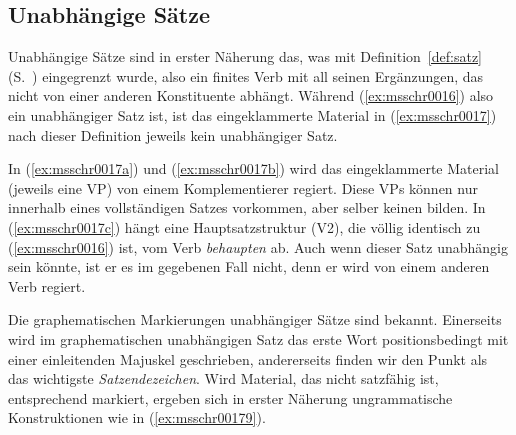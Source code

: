 \subsection{Unabhängige Sätze}

\label{sec:hauptsatzschreib}

Unabhängige Sätze sind in erster Näherung das, was mit Definition~\ref{def:satz} (S.~\pageref{def:satz}) eingegrenzt wurde, also ein finites Verb mit all seinen Ergänzungen, das nicht von einer anderen Konstituente abhängt.
Während (\ref{ex:msschr0016}) also ein unabhängiger Satz ist, ist das eingeklammerte Material in (\ref{ex:msschr0017}) nach dieser Definition jeweils kein unabhängiger Satz.

\begin{exe}
  \ex\label{ex:msschr0017}
  \begin{xlist}
  \end{xlist}
\end{exe}

In (\ref{ex:msschr0017a}) und (\ref{ex:msschr0017b}) wird das eingeklammerte Material (jeweils eine VP) von einem Komplementierer regiert.
Diese VPs können nur innerhalb eines vollständigen Satzes vorkommen, aber selber keinen bilden.
In (\ref{ex:msschr0017c}) hängt eine Hauptsatzstruktur (V2), die völlig identisch zu (\ref{ex:msschr0016}) ist, vom Verb \textit{behaupten} ab.
Auch wenn dieser Satz unabhängig sein könnte, ist er es im gegebenen Fall nicht, denn er wird von einem anderen Verb regiert.

Die graphematischen Markierungen unabhängiger Sätze sind bekannt.
Einerseits wird im graphematischen unabhängigen Satz das erste Wort positionsbedingt mit einer einleitenden Majuskel geschrieben, andererseits finden wir den Punkt als das wichtigste \textit{Satzendezeichen}.
Wird Material, das nicht satzfähig ist, entsprechend markiert, ergeben sich in erster Näherung ungrammatische Konstruktionen wie in (\ref{ex:msschr00179}).

\Enl

\begin{exe}
  \ex\label{ex:msschr00179}
  \begin{xlist}
  \end{xlist}
\end{exe}

